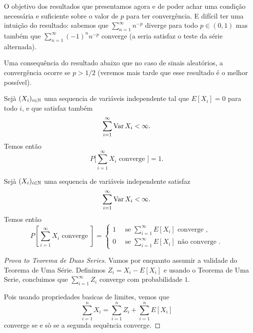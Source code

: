 \begin{topics}
O objetivo dos resultados que presentamos agora e de poder achar uma condição necessária e suficiente sobre o valor de $p$ para ter convergência.
E difícil ter uma intuição do resultado: sabemos que  $\sum_{n=1}^{\infty} n^{-p}$ diverge para todo $p\in (0,1)$ mas também que
$\sum_{n=1}^{\infty}(-1)^n n^{-p}$ converge (a seria satisfaz o teste da série alternada).

\medskip

Uma consequência do resultado abaixo que no caso de sinais aleatórios, a convergência ocorre se $p > 1/2$ (veremos mais tarde que esse resultado é o melhor possível).

\begin{theorem}
  Sejà $(X_i)_{i\in {\ensuremath{\mathbb N}}}$ uma sequencia de variáveis independente tal que $E[X_i]=0$ para todo $i$, e que satisfaz também
  \begin{equation}
    \sum_{i=1}^\infty \operatorname{Var} X_i<\infty.
  \end{equation}
  Temos então
  \begin{equation}
    P \Big[ \sum_{i=1}^{\infty} X_i \text{ converge } \Big] = 1.
\end{equation}
\end{theorem}

\begin{theorem}
  Sejà $(X_i)_{i\in {\ensuremath{\mathbb N}}}$ uma sequencia de variáveis independente satisfaz
  \begin{equation}
    \sum_{i=1}^\infty \operatorname{Var} X_i<\infty.
  \end{equation}
  Temos então
  \begin{equation}
    P[\sum_{i=1}^{\infty} X_i \text{ converge } ] =
    \begin{cases}
      1 \quad \text{ se } \sum_{i=1}^\infty E[X_i] \text{ converge },\\
      0 \quad \text{ se } \sum_{i=1}^\infty E[X_i] \text{ não converge }.
    \end{cases}
  \end{equation}
\end{theorem}

\begin{proof}[Prova to Teorema de Duas Series]
  Vamos por enquanto assumir a validade do Teorema de Uma Série.
  Definimos $Z_i = X_i - E[X_i]$ e usando o Teorema de Uma Serie, concluimos que $\sum_{i=1}^{\infty} Z_i$ converge com probabilidade $1$.

  \medskip

  Pois usando propriedades basicas de limites, vemos que $$\sum_{i=1}^n X_i=\sum_{i=1}^n Z_i+ \sum_{i=1}^n E[X_i]$$ converge se e sò se a segunda sequência converge.
\end{proof}


\end{topics}
